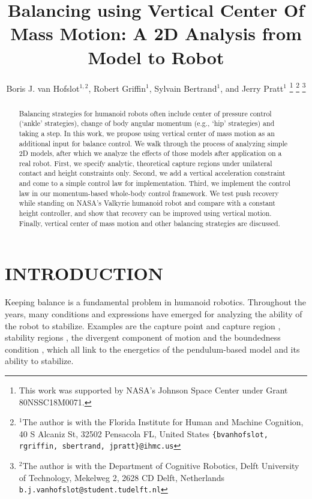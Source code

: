 \documentclass[letterpaper, 10 pt, conference]{ieeeconf}  %
\title{\LARGE \bf
Balancing using Vertical Center Of Mass Motion: A 2D Analysis from Model to Robot
}
\author{Boris J. van Hofslot$^{1,2}$, Robert Griffin$^1$, Sylvain Bertrand$^1$, and Jerry Pratt$^1$%
\thanks{This work was supported by NASA's Johnson Space Center under Grant 80NSSC18M0071.}%
\thanks{$^{1}$The author is with the Florida Institute for Human and Machine Cognition, 40 S Alcaniz St, 32502 Pensacola FL, United States
        {\tt\small \{bvanhofslot, rgriffin, sbertrand, jpratt\}@ihmc.us}}%
\thanks{$^{2}$The author is with the Department of Cognitive Robotics, Delft University of Technology, Mekelweg 2, 2628 CD Delft, Netherlands
        {\tt\small b.j.vanhofslot@student.tudelft.nl}}%
}
\begin{document}
\maketitle
\thispagestyle{empty}
\pagestyle{empty}



\begin{abstract}
Balancing strategies for humanoid robots often include center of pressure control (`ankle' strategies), change of body angular momentum (e.g., `hip' strategies) and taking a step. In this work, we propose using vertical center of mass motion as an additional input for balance control. We walk through the process of analyzing simple 2D models, after which we analyze the effects of those models after application on a real robot. First, we specify analytic, theoretical capture regions under unilateral contact and height constraints only. Second, we add a vertical acceleration constraint and come to a simple control law for implementation. Third, we implement the control law in our momentum-based whole-body control framework. We test push recovery while standing on NASA's Valkyrie humanoid robot and compare with a constant height controller, and show that recovery can be improved using vertical motion. Finally, vertical center of mass motion and other balancing strategies are discussed.
\end{abstract}



\section{INTRODUCTION}
Keeping balance is a fundamental problem in humanoid robotics. Throughout the years, many conditions and expressions have emerged for analyzing the ability of the robot to stabilize. Examples are the capture point and capture region \cite{pratt2006capture, koolen2012capturability}, stability regions \cite{stephens2007humanoid}, the divergent component of motion \cite{takenaka2009real} and the boundedness condition \cite{lanari2014boundedness}, which all link to the energetics of the pendulum-based model and its ability to stabilize.
\end{document}
